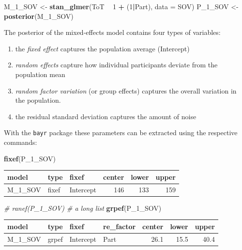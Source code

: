 \documentclass[]{svmono}
\newenvironment{Shaded}{\begin{snugshade}}{\end{snugshade}}
\newcommand{\KeywordTok}[1]{\textcolor[rgb]{0.13,0.29,0.53}{\textbf{#1}}}
\newcommand{\DataTypeTok}[1]{\textcolor[rgb]{0.13,0.29,0.53}{#1}}
\newcommand{\DecValTok}[1]{\textcolor[rgb]{0.00,0.00,0.81}{#1}}
\newcommand{\StringTok}[1]{\textcolor[rgb]{0.31,0.60,0.02}{#1}}
\newcommand{\CommentTok}[1]{\textcolor[rgb]{0.56,0.35,0.01}{\textit{#1}}}
\newcommand{\OperatorTok}[1]{\textcolor[rgb]{0.81,0.36,0.00}{\textbf{#1}}}
\newcommand{\NormalTok}[1]{#1}
\providecommand{\tightlist}{%
  \setlength{\itemsep}{0pt}\setlength{\parskip}{0pt}}
\theoremstyle{definition}
\theoremstyle{definition}
\theoremstyle{definition}
\theoremstyle{remark}
\begin{document}
\begin{Shaded}
\begin{Highlighting}[]
\NormalTok{M_1_SOV <-}\StringTok{ }\KeywordTok{stan_glmer}\NormalTok{(ToT }\OperatorTok{~}\StringTok{ }\DecValTok{1} \OperatorTok{+}\StringTok{ }\NormalTok{(}\DecValTok{1}\OperatorTok{|}\NormalTok{Part), }\DataTypeTok{data =}\NormalTok{ SOV)}
\NormalTok{P_1_SOV <-}\StringTok{ }\KeywordTok{posterior}\NormalTok{(M_1_SOV)}
\end{Highlighting}
\end{Shaded}

The posterior of the mixed-effects model contains four types of
variables:

\begin{enumerate}
\def\labelenumi{\arabic{enumi}.}
\tightlist
\item
  the \emph{fixed effect} captures the population average (Intercept)
\item
  \emph{random effects} capture how individual participants deviate from
  the population mean
\item
  \emph{random factor variation} (or group effects) captures the overall
  variation in the population.
\item
  the residual standard deviation captures the amount of noise
\end{enumerate}

With the \texttt{bayr} package these parameters can be extracted using
the respective commands:

\begin{Shaded}
\begin{Highlighting}[]
\KeywordTok{fixef}\NormalTok{(P_1_SOV)}
\end{Highlighting}
\end{Shaded}

\begin{longtable}[]{@{}lllrrr@{}}
\toprule
model & type & fixef & center & lower & upper\tabularnewline
\midrule
\endhead
M\_1\_SOV & fixef & Intercept & 146 & 133 & 159\tabularnewline
\bottomrule
\end{longtable}

\begin{Shaded}
\begin{Highlighting}[]
\CommentTok{# ranef(P_1_SOV) # a long list}
\KeywordTok{grpef}\NormalTok{(P_1_SOV)}
\end{Highlighting}
\end{Shaded}

\begin{longtable}[]{@{}llllrrr@{}}
\toprule
model & type & fixef & re\_factor & center & lower &
upper\tabularnewline
\midrule
\endhead
M\_1\_SOV & grpef & Intercept & Part & 26.1 & 15.5 & 40.4\tabularnewline
\bottomrule
\end{longtable}
\end{document}
